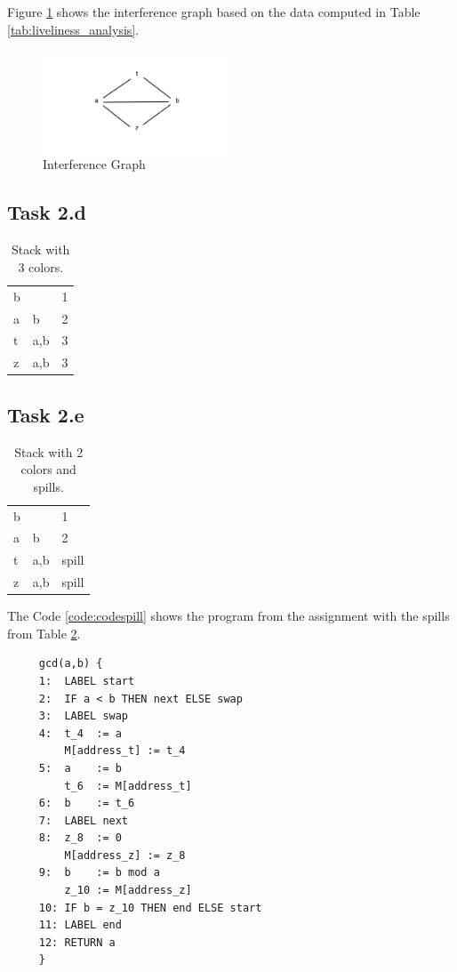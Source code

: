 \documentclass[11pt,a4paper]{article}
\theoremstyle{plain}
\theoremstyle{definition}
\theoremstyle{remark}
\numberwithin{equation}{section}
\begin{document}
Figure \ref{fig:interference_graph} shows the interference graph based on the data computed in Table \ref{tab:liveliness_analysis}.
\begin{figure}[H]
  \centering
    \includegraphics[width=0.5\textwidth]{fig/interference}
      \caption{Interference Graph}
      \label{fig:interference_graph}
\end{figure}
\subsection*{Task 2.d}
\begin{table}[H]
	\centering
	\begin{tabular}{l|l|l}
		b &     & 1 \\
		a & b   & 2 \\
		t & a,b & 3 \\
		z & a,b & 3
	\end{tabular}
	\caption{Stack with 3 colors.}
	\label{fig:3colorstack}
\end{table}
\subsection*{Task 2.e}
\begin{table}[H]
	\centering
	\begin{tabular}{l|l|l}
		b &     & 1 \\
		a & b   & 2 \\
		t & a,b & spill \\
		z & a,b & spill
	\end{tabular}
	\caption{Stack with 2 colors and spills.}
	\label{fig:2colorstack}
\end{table}

The Code \ref{code:codespill} shows the program from the assignment with the spills from Table \ref{fig:2colorstack}.
\begin{code}[H]
\begin{verbatim}
     gcd(a,b) {
     1:  LABEL start
     2:  IF a < b THEN next ELSE swap
     3:  LABEL swap
     4:  t_4  := a
         M[address_t] := t_4
     5:  a    := b
         t_6  := M[address_t]
     6:  b    := t_6
     7:  LABEL next
     8:  z_8  := 0
         M[address_z] := z_8
     9:  b    := b mod a
         z_10 := M[address_z]
     10: IF b = z_10 THEN end ELSE start
     11: LABEL end
     12: RETURN a
     }
\end{verbatim}
\caption{Program from Task 2 after spilling.}
\label{code:codespill}	
\end{code}
\end{document}
